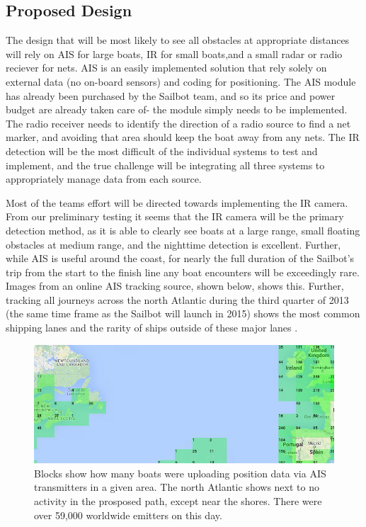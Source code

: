 \subsection{\label{sec:method:proposed-design}Proposed Design}
The design that will be most likely to see all obstacles at appropriate distances will rely on AIS for large boats, IR for small boats,and  a small radar or radio reciever for nets. AIS is an easily implemented solution that rely solely on external data (no on-board sensors) and coding for positioning. The AIS module has already been purchased by the Sailbot team, and so its price and power budget are already taken care of- the module simply needs to be implemented. The radio receiver needs to identify the direction of a radio source to find a net marker, and avoiding that area should keep the boat away from any nets. The IR detection will be the most difficult of the individual systems to test and implement, and the true challenge will be integrating all three systems to appropriately manage data from each source.

Most of the teams effort will be directed towards implementing the IR camera. From our preliminary testing it seems that the IR camera will be the primary detection method, as it is able to clearly see boats at a large range, small floating obstacles at medium range, and the nighttime detection is excellent. Further, while AIS is useful around the coast, for nearly the full duration of the Sailbot's trip from the start to the finish line any boat encounters will be exceedingly rare. Images from an online AIS tracking source, shown below, shows this. Further, tracking all journeys across the north Atlantic during the third quarter of 2013 (the same time frame as the Sailbot will launch in 2015) shows the most common shipping lanes and the rarity of ships outside of these major lanes \cite{marine-traffic}.

\begin{figure}
\includegraphics[width=120mm,natwidth=540,natheight=459]{"./image/AIS_emitters_north_atlantic"}
\caption[All AIS emitters in the North Atlantic on Wednesday, November 26 2014.]{\label{fig:ais-emitters}Blocks show how many boats were uploading position data via AIS transmitters in a given area. The north Atlantic shows next to no activity in the prosposed path, except near the shores. There were over 59,000 worldwide emitters on this day.}
\end{figure}

